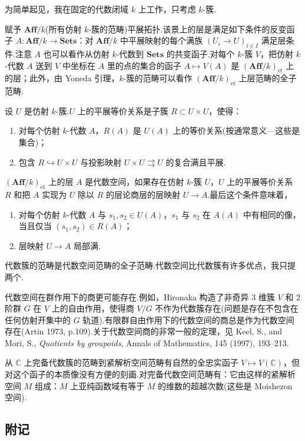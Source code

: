 为简单起见，我在固定的代数闭域 $k$ 上工作，只考虑 $k$-簇.

赋予 $\mathbf{Aff}/k$(所有仿射 $k$-簇的范畴)平展拓扑.该景上的层是满足如下条件的反变函子 $A \colon \mathbf{Aff}/k \to \mathbf{Sets}$：对 $\mathbf{Aff}/k$ 中平展映射的每个满族 $(U_i \to U)_{i \in I}$ 满足层条件.注意 $A$ 也可以看作从仿射 $k$-代数到 $\mathbf{Sets}$ 的共变函子.对每个 $k$-簇 $V$，把仿射 $k$-代数 $A$ 送到 $V$ 中坐标在 $A$ 里的点的集合的函子 $A \mapsto V(A)$ 是 $(\mathbf{Aff}/k)_{\mathrm{et}}$ 上的层；此外，由 Yoneda 引理，$k$-簇的范畴可以看作 $(\mathbf{Aff}/k)_{\mathrm{et}}$ 上层范畴的全子范畴.

设 $U$ 是仿射 $k$-簇.$U$ 上的平展等价关系是子簇 $R \subset U \times U$，使得：
\begin{enumerate}
  \item 对每个仿射 $k$-代数 $A$，$R(A)$ 是 $U(A)$ 上的等价关系(按通常意义---这些是集合)；
  \item 包含 $R \hookrightarrow U \times U$ 与投影映射 $U \times U \rightrightarrows U$ 的复合满且平展.
\end{enumerate}
$(\mathbf{Aff}/k)_{\mathrm{et}}$ 上的层 $A$ 是代数空间，如果存在仿射 $k$-簇 $U$，$U$ 上的平展等价关系 $R$ 和把 $A$ 实现为 $U$ 除以 $R$ 的层论商层的层映射 $U \to A$.最后这个条件意味着，
\begin{enumerate}
  \item 对每个仿射 $k$-代数 $A$ 与 $s_1, s_2 \in U(A)$，$s_1$ 与 $s_2$ 在 $A(A)$ 中有相同的像，当且仅当 $(s_1, s_2) \in R(A)$；
  \item 层映射 $U \to A$ 局部满.
\end{enumerate}
代数簇的范畴是代数空间范畴的全子范畴.代数空间比代数簇有许多优点，我只提两个.

代数空间在群作用下的商更可能存在.例如，Hironaka 构造了非奇异 3 维簇 $V$ 和 2 阶群 $G$ 在 $V$ 上的自由作用，使得商 $V/G$ 不作为代数簇存在(问题是存在不包含在任何仿射开集中的 $G$ 轨道).有限群自由作用下的代数空间的商总是作为代数空间存在(Artin 1973, p.109).关于代数空间商的非常一般的定理，见 Keel, S., and Mori, S., \emph{Quotients by groupoids}, Annals of Mathematics, 145 (1997), 193--213.

从 $\mathbb{C}$ 上完备代数簇的范畴到紧解析空间范畴有自然的全忠实函子 $V \mapsto V(\mathbb{C})$，但对这个函子的本质像没有方便的刻画.对完备代数空间范畴有：它由这样的紧解析空间 $M$ 组成：$M$ 上亚纯函数域有等于 $M$ 的维数的超越次数(这些是 Moishezon 空间).

\subsection*{附记}

